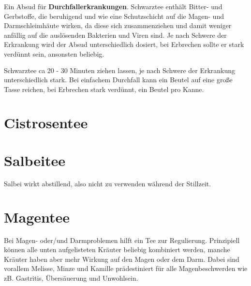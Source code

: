 


Ein Absud für \textbf{Durchfallerkrankungen}. Schwarztee enthält Bitter- und Gerbstoffe, die beruhigend und wie eine Schutzschicht auf die Magen- und Darmschleimhäute wirken, da diese sich zusammenziehen und damit weniger anfällig auf die auslösenden Bakterien und Viren sind. Je nach Schwere der Erkrankung wird der Absud unterschiedlich dosiert, bei Erbrechen sollte er stark verdünnt sein, ansonsten beliebig.



Schwarztee ca 20 - 30 Minuten ziehen lassen, je nach Schwere der Erkrankung unterschiedlich stark. Bei einfachem Durchfall kann ein Beutel auf eine große Tasse reichen, bei Erbrechen stark verdünnt, ein Beutel pro Kanne.




\newpage

\section{Cistrosentee}
\label{   }






\newpage

\section{Salbeitee}
\label{   }


  


Salbei wirkt abstillend, also nicht zu verwenden während der Stillzeit.



\newpage

\section{Magentee}
\label{   }

Bei Magen- oder/und Darmproblemen hilft ein Tee zur Regulierung. Prinzipiell können alle unten aufgelisteten Kräuter beliebig kombiniert werden, manche Kräuter haben aber mehr Wirkung auf den Magen oder dem Darm. Dabei sind vorallem Melisse, Minze und Kamille prädestiniert für alle Magenbeschwerden wie zB. Gastritis, Übersäuerung und Unwohlsein.

